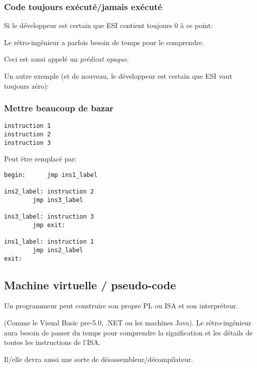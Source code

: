 \subsubsection{Code toujours exécuté/jamais exécuté}

Si le développeur est certain que ESI contient toujours 0 à ce point:



Le rétro-ingénieur a parfois besoin de temps pour le comprendre.

Ceci est aussi appelé un \emph{prédicat opaque}.

Un autre exemple (et de nouveau, le développeur est certain que ESI vaut toujours
zéro):



\subsubsection{Mettre beaucoup de bazar}

\begin{lstlisting}
instruction 1
instruction 2
instruction 3
\end{lstlisting}

Peut être remplacé par:

\begin{lstlisting}[style=customasmx86]
begin:		jmp	ins1_label

ins2_label:	instruction 2
		jmp	ins3_label

ins3_label:	instruction 3
		jmp	exit:

ins1_label:	instruction 1
		jmp	ins2_label
exit:
\end{lstlisting}



\subsection{Machine virtuelle / pseudo-code}

Un programmeur peut construire son propre \ac{PL} ou \ac{ISA} et son interpréteur.

(Comme le Visual Basic pre-5.0, .NET ou les machines Java).
Le rétro-ingénieur aura besoin de passer du temps pour comprendre la signification
et les détails de toutes les instructions de l'\ac{ISA}.

Il/elle devra aussi une sorte de désassembleur/décompilateur.

